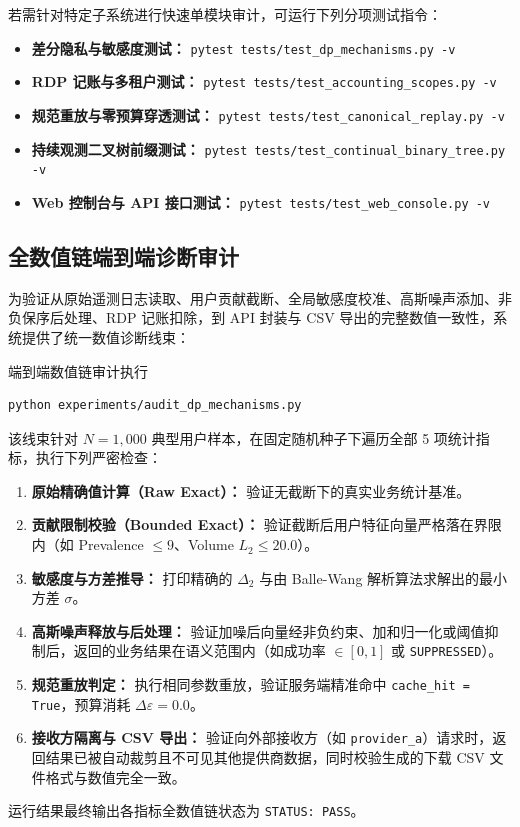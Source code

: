 若需针对特定子系统进行快速单模块审计，可运行下列分项测试指令：
\begin{itemize}[itemsep=2pt,topsep=2pt]
  \item \textbf{差分隐私与敏感度测试：} \verb|pytest tests/test_dp_mechanisms.py -v|
  \item \textbf{RDP 记账与多租户测试：} \verb|pytest tests/test_accounting_scopes.py -v|
  \item \textbf{规范重放与零预算穿透测试：} \verb|pytest tests/test_canonical_replay.py -v|
  \item \textbf{持续观测二叉树前缀测试：} \verb|pytest tests/test_continual_binary_tree.py -v|
  \item \textbf{Web 控制台与 API 接口测试：} \verb|pytest tests/test_web_console.py -v|
\end{itemize}

\subsection{全数值链端到端诊断审计}

为验证从原始遥测日志读取、用户贡献截断、全局敏感度校准、高斯噪声添加、非负保序后处理、RDP 记账扣除，到 API 封装与 CSV 导出的完整数值一致性，系统提供了统一数值诊断线束：

\begin{techbox}{端到端数值链审计执行}
\begin{verbatim}
python experiments/audit_dp_mechanisms.py
\end{verbatim}
\end{techbox}

该线束针对 $N=1,000$ 典型用户样本，在固定随机种子下遍历全部 5 项统计指标，执行下列严密检查：
\begin{enumerate}[itemsep=1pt,topsep=2pt]
  \item \textbf{原始精确值计算（Raw Exact）：} 验证无截断下的真实业务统计基准。
  \item \textbf{贡献限制校验（Bounded Exact）：} 验证截断后用户特征向量严格落在界限内（如 Prevalence $\le 9$、Volume $L_2 \le 20.0$）。
  \item \textbf{敏感度与方差推导：} 打印精确的 $\Delta_2$ 与由 Balle-Wang 解析算法求解出的最小方差 $\sigma$。
  \item \textbf{高斯噪声释放与后处理：} 验证加噪后向量经非负约束、加和归一化或阈值抑制后，返回的业务结果在语义范围内（如成功率 $\in [0, 1]$ 或 \texttt{SUPPRESSED}）。
  \item \textbf{规范重放判定：} 执行相同参数重放，验证服务端精准命中 \verb|cache_hit = True|，预算消耗 $\Delta\varepsilon = 0.0$。
  \item \textbf{接收方隔离与 CSV 导出：} 验证向外部接收方（如 \texttt{provider\_a}）请求时，返回结果已被自动裁剪且不可见其他提供商数据，同时校验生成的下载 CSV 文件格式与数值完全一致。
\end{enumerate}
运行结果最终输出各指标全数值链状态为 \verb|STATUS: PASS|。

